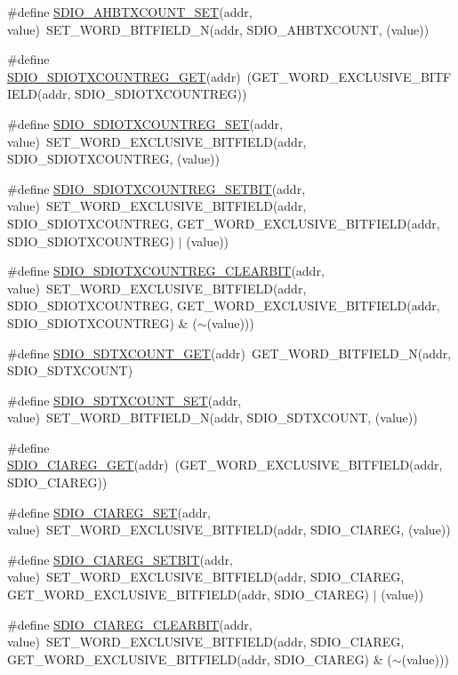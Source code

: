 \begin{DoxyCompactItemize}
\#define \hyperlink{a00570_a7b895fd0d0da630067c2ab45bb8357ea}{SDIO\_\-AHBTXCOUNT\_\-SET}(addr, value)~SET\_\-WORD\_\-BITFIELD\_\-N(addr, SDIO\_\-AHBTXCOUNT, (value))
\item 
\#define \hyperlink{a00570_a8ef644baa3250cc09defadc84e114f56}{SDIO\_\-SDIOTXCOUNTREG\_\-GET}(addr)~(GET\_\-WORD\_\-EXCLUSIVE\_\-BITFIELD(addr, SDIO\_\-SDIOTXCOUNTREG))
\item 
\#define \hyperlink{a00570_a4a5954c6c50bcab0a93d25bf4e60a177}{SDIO\_\-SDIOTXCOUNTREG\_\-SET}(addr, value)~SET\_\-WORD\_\-EXCLUSIVE\_\-BITFIELD(addr, SDIO\_\-SDIOTXCOUNTREG, (value))
\item 
\#define \hyperlink{a00570_a890bc54f282e3ec5c00a06a5e0bd061b}{SDIO\_\-SDIOTXCOUNTREG\_\-SETBIT}(addr, value)~SET\_\-WORD\_\-EXCLUSIVE\_\-BITFIELD(addr, SDIO\_\-SDIOTXCOUNTREG, GET\_\-WORD\_\-EXCLUSIVE\_\-BITFIELD(addr, SDIO\_\-SDIOTXCOUNTREG) $|$ (value))
\item 
\#define \hyperlink{a00570_a29a48a00db03e3c21bc44f8c49690d5b}{SDIO\_\-SDIOTXCOUNTREG\_\-CLEARBIT}(addr, value)~SET\_\-WORD\_\-EXCLUSIVE\_\-BITFIELD(addr, SDIO\_\-SDIOTXCOUNTREG, GET\_\-WORD\_\-EXCLUSIVE\_\-BITFIELD(addr, SDIO\_\-SDIOTXCOUNTREG) \& ($\sim$(value)))
\item 
\#define \hyperlink{a00570_ac6556ca78f61c753ba70c729eaf13ae4}{SDIO\_\-SDTXCOUNT\_\-GET}(addr)~GET\_\-WORD\_\-BITFIELD\_\-N(addr, SDIO\_\-SDTXCOUNT)
\item 
\#define \hyperlink{a00570_a9274b6b15e195aa6517df7ac05d51158}{SDIO\_\-SDTXCOUNT\_\-SET}(addr, value)~SET\_\-WORD\_\-BITFIELD\_\-N(addr, SDIO\_\-SDTXCOUNT, (value))
\item 
\#define \hyperlink{a00570_aa8e2c62d3aa5fd7b9aff76e281c02b12}{SDIO\_\-CIAREG\_\-GET}(addr)~(GET\_\-WORD\_\-EXCLUSIVE\_\-BITFIELD(addr, SDIO\_\-CIAREG))
\item 
\#define \hyperlink{a00570_a5ca65e26c93282e29db818d91c91fe46}{SDIO\_\-CIAREG\_\-SET}(addr, value)~SET\_\-WORD\_\-EXCLUSIVE\_\-BITFIELD(addr, SDIO\_\-CIAREG, (value))
\item 
\#define \hyperlink{a00570_a770b2e2fdbcfd0712072c9cf64032b7a}{SDIO\_\-CIAREG\_\-SETBIT}(addr, value)~SET\_\-WORD\_\-EXCLUSIVE\_\-BITFIELD(addr, SDIO\_\-CIAREG, GET\_\-WORD\_\-EXCLUSIVE\_\-BITFIELD(addr, SDIO\_\-CIAREG) $|$ (value))
\item 
\#define \hyperlink{a00570_a846935185639976b91e3566953f922d3}{SDIO\_\-CIAREG\_\-CLEARBIT}(addr, value)~SET\_\-WORD\_\-EXCLUSIVE\_\-BITFIELD(addr, SDIO\_\-CIAREG, GET\_\-WORD\_\-EXCLUSIVE\_\-BITFIELD(addr, SDIO\_\-CIAREG) \& ($\sim$(value)))

\end{DoxyCompactItemize}
